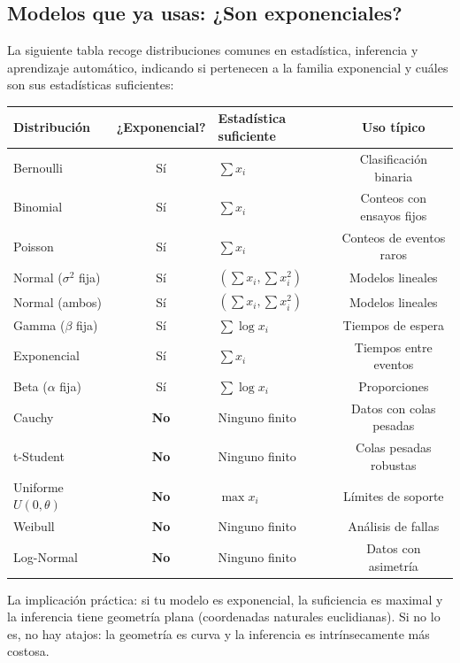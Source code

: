 \subsection*{Modelos que ya usas: ¿Son exponenciales?}

La siguiente tabla recoge distribuciones comunes en estadística, inferencia y aprendizaje automático, indicando si pertenecen a la familia exponencial y cuáles son sus estadísticas suficientes:

\begin{center}
	\renewcommand{\arraystretch}{1.2}
	\begin{tabular}{|l|c|l|c|}
		\hline
		\textbf{Distribución} & \textbf{¿Exponencial?} & \textbf{Estadística suficiente} & \textbf{Uso típico} \\
		\hline
		Bernoulli & Sí & $\sum x_i$ & Clasificación binaria \\
		Binomial & Sí & $\sum x_i$ & Conteos con ensayos fijos \\
		Poisson & Sí & $\sum x_i$ & Conteos de eventos raros \\
		Normal ($\sigma^2$ fija) & Sí & $(\sum x_i, \sum x_i^2)$ & Modelos lineales \\
		Normal (ambos) & Sí & $(\sum x_i, \sum x_i^2)$ & Modelos lineales \\
		Gamma ($\beta$ fija) & Sí & $\sum \log x_i$ & Tiempos de espera \\
		Exponencial & Sí & $\sum x_i$ & Tiempos entre eventos \\
		Beta ($\alpha$ fija) & Sí & $\sum \log x_i$ & Proporciones \\
		Cauchy & \textbf{No} & Ninguno finito & Datos con colas pesadas \\
		t-Student & \textbf{No} & Ninguno finito & Colas pesadas robustas \\
		Uniforme $U(0,\theta)$ & \textbf{No} & $\max x_i$ & Límites de soporte \\
		Weibull & \textbf{No} & Ninguno finito & Análisis de fallas \\
		Log-Normal & \textbf{No} & Ninguno finito & Datos con asimetría \\
		\hline
	\end{tabular}
\end{center}

\noindent La implicación práctica: si tu modelo es exponencial, la suficiencia es maximal y la inferencia tiene geometría plana (coordenadas naturales euclidianas).  Si no lo es, no hay atajos: la geometría es curva y la inferencia es intrínsecamente más costosa.

